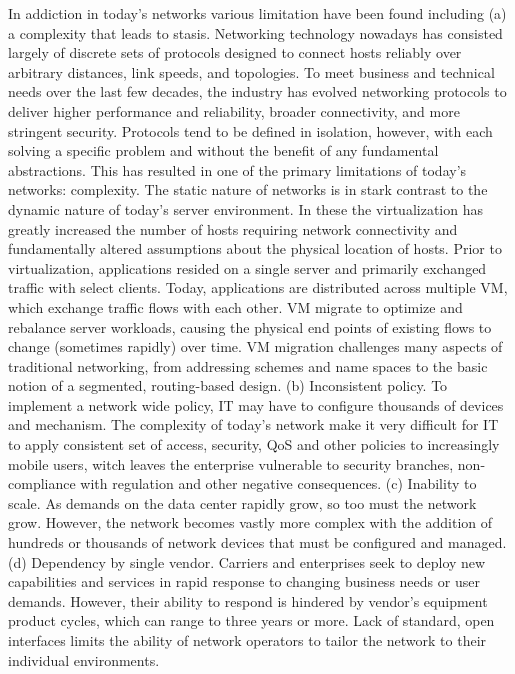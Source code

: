 In addiction in today's networks various limitation have been found including (a) a complexity that leads to stasis. Networking technology nowadays has consisted largely of discrete sets of protocols designed to connect hosts reliably over arbitrary distances, link speeds, and topologies. To meet business and technical needs over the last few decades, the industry has evolved networking protocols to deliver higher performance and reliability, broader connectivity, and more stringent security. Protocols tend to be defined in isolation, however, with each solving a specific problem and without the benefit of any fundamental abstractions. This has resulted in one of the primary limitations of today's networks: complexity. The static nature of networks is in stark contrast to the dynamic nature of today's server environment. In these the virtualization has greatly increased the number of hosts requiring network connectivity and fundamentally altered assumptions about the physical location of hosts. Prior to virtualization, applications resided on a single server and primarily exchanged traffic with select clients. Today, applications are distributed across multiple \ac{VM}, which exchange traffic flows with each other. \ac{VM} migrate to optimize and rebalance server workloads, causing the physical end points of existing flows to change (sometimes rapidly) over time. \ac{VM} migration challenges many aspects of traditional networking, from addressing schemes and name spaces to the basic notion of a segmented, routing-based design. (b) Inconsistent policy. To implement a network wide policy, \ac{IT} may have to configure thousands of devices and mechanism. The complexity of today's network make it very difficult for \ac{IT} to apply consistent set of access, security, \ac{QoS} and other policies to increasingly mobile users, witch leaves the enterprise vulnerable to security branches, non-compliance with regulation and other negative consequences. (c) Inability to scale. As demands on the data center rapidly grow, so too must the network grow. However, the network becomes vastly more complex with the addition of hundreds or thousands of network devices that must be configured and managed. (d) Dependency by single vendor. Carriers and enterprises seek to deploy new capabilities and services in rapid response to changing business needs or user demands. However, their ability to respond is hindered by vendor's equipment product cycles, which can range to three years or more. Lack of standard, open interfaces limits the ability of network operators to tailor the network to their individual environments.

